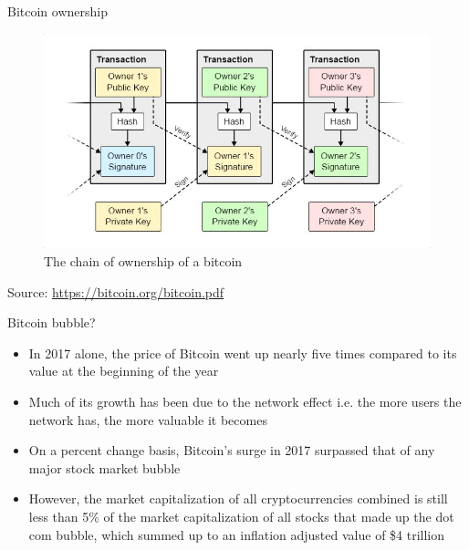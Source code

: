 \documentclass[11pt]{beamer}
\begin{document}
\begin{frame}{Bitcoin ownership}
	\begin{figure}[]
		\centering
		\includegraphics  [scale=0.5]{Images/ownership}
		\caption{The chain of ownership of a bitcoin}
	\end{figure}
	\begin{tiny}
		Source: \href{https://bitcoin.org/bitcoin.pdf}{https://bitcoin.org/bitcoin.pdf}
	\end{tiny}
\end{frame}


\begin{frame}{Bitcoin bubble?}
	\begin{itemize}
		\item In 2017 alone, the price of Bitcoin went up nearly five times compared to its value at the beginning of the year
		\item Much of its growth has been due to the network effect i.e. the more users the network has, the more valuable it becomes
		\item On a percent change basis, Bitcoin's surge in 2017 surpassed that of any major stock market bubble
		\item However, the market capitalization of all cryptocurrencies combined is still less than 5\% of the market capitalization of all stocks that made up the dot com bubble, which summed up to an inflation adjusted value of \$4 trillion
	\end{itemize}
\end{frame}
\end{document}
